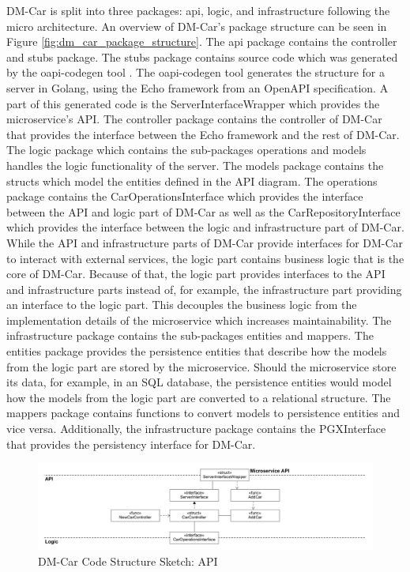 DM-Car is split into three packages: api, logic, and infrastructure following
the micro architecture. An overview of DM-Car's package structure can be
seen in Figure \ref{fig:dm_car_package_structure}. The api package contains the
controller and stubs package. The stubs package contains source code which was generated by the
oapi-codegen tool \cite{DEE-OAPI}. The oapi-codegen tool \cite{CM-G-GEN}
generates the structure for a server in Golang, using the Echo framework
\cite{LAB-DOCS} from an OpenAPI specification. 
A part of this generated code is the ServerInterfaceWrapper which provides
the microservice's API. The controller package contains the controller of DM-Car
that provides the interface between the Echo framework and the rest of DM-Car.
The logic package which contains the sub-packages operations and models handles
the logic functionality of the server. The models package contains the structs
which model the entities defined in the API diagram. The operations
package contains the CarOperationsInterface which provides the interface
between the API and logic part of DM-Car as well as the CarRepositoryInterface
which provides the interface between the logic and infrastructure part of DM-Car.
While the API and infrastructure parts of DM-Car provide interfaces
for DM-Car to interact with external services,
the logic part contains business logic that is the core of DM-Car.
Because of that, the logic part provides interfaces to the API and infrastructure
parts instead of, for example, the infrastructure part providing an interface to the logic part.
This decouples the business logic from the implementation details of the microservice
which increases maintainability.
The infrastructure package contains the sub-packages entities and mappers.
The entities package provides the persistence entities that describe how the models
from the logic part are stored by the microservice. Should the microservice
store its data, for example, in an SQL database, the persistence entities
would model how the models from the logic part are converted to a relational structure.
The mappers package contains functions to convert models to persistence entities
and vice versa. Additionally, the infrastructure package contains the PGXInterface
that provides the persistency interface for DM-Car. 

\begin{figure}[h]
	\centering
	\includegraphics[width=\textwidth]{figures/dm_car_css_api.png}
	\caption{DM-Car Code Structure Sketch: API}
	\label{fig:dm_car_css_api}
\end{figure}

